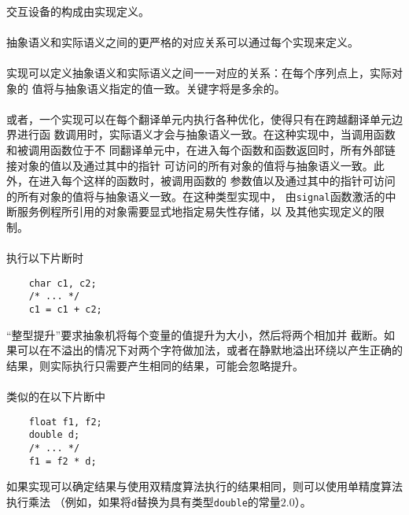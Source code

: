 \paragraph{}
交互设备的构成由实现定义。

\paragraph{}
抽象语义和实际语义之间的更严格的对应关系可以通过每个实现来定义。

\paragraph{}
\ex 实现可以定义抽象语义和实际语义之间一一对应的关系：在每个序列点上，实际对象的
值将与抽象语义指定的值一致。关键字将是多余的。

\paragraph{}
或者，一个实现可以在每个翻译单元内执行各种优化，使得只有在跨越翻译单元边界进行函
数调用时，实际语义才会与抽象语义一致。在这种实现中，当调用函数和被调用函数位于不
同翻译单元中，在进入每个函数和函数返回时，所有外部链接对象的值以及通过其中的指针
可访问的所有对象的值将与抽象语义一致。此外，在进入每个这样的函数时，被调用函数的
参数值以及通过其中的指针可访问的所有对象的值将与抽象语义一致。在这种类型实现中，
由\texttt{signal}函数激活的中断服务例程所引用的对象需要显式地指定易失性存储，以
及其他实现定义的限制。

\paragraph{}
\ex 执行以下片断时
\begin{lstlisting}
    char c1, c2;
    /* ... */
    c1 = c1 + c2;
\end{lstlisting}
``整型提升''要求抽象机将每个变量的值提升为大小，然后将两个相加并
截断。如果可以在不溢出的情况下对两个字符做加法，或者在静默地溢出环绕以产生正确的
结果，则实际执行只需要产生相同的结果，可能会忽略提升。

\paragraph{}
\ex 类似的在以下片断中
\begin{lstlisting}
    float f1, f2;
    double d;
    /* ... */
    f1 = f2 * d;
\end{lstlisting}
如果实现可以确定结果与使用双精度算法执行的结果相同，则可以使用单精度算法执行乘法
（例如，如果将\texttt{d}替换为具有类型\texttt{double}的常量$2.0$）。

